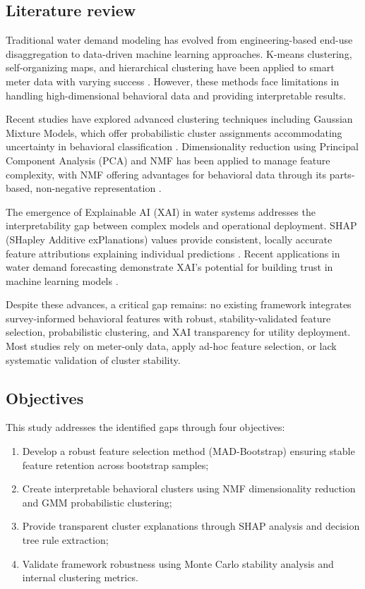 \documentclass[a4paper,12pt]{article}
\begin{document}
\subsection{Literature review}

Traditional water demand modeling has evolved from engineering-based end-use disaggregation \citep{Stewart2010} to data-driven machine learning approaches. K-means clustering, self-organizing maps, and hierarchical clustering have been applied to smart meter data with varying success \citep{CardellOliver2016}. However, these methods face limitations in handling high-dimensional behavioral data and providing interpretable results.

Recent studies have explored advanced clustering techniques including Gaussian Mixture Models, which offer probabilistic cluster assignments accommodating uncertainty in behavioral classification \citep{Cominola2019}. Dimensionality reduction using Principal Component Analysis (PCA) and NMF has been applied to manage feature complexity, with NMF offering advantages for behavioral data through its parts-based, non-negative representation \citep{Lee1999}.

The emergence of Explainable AI (XAI) in water systems addresses the interpretability gap between complex models and operational deployment. SHAP (SHapley Additive exPlanations) values provide consistent, locally accurate feature attributions explaining individual predictions \citep{Lundberg2017}. Recent applications in water demand forecasting demonstrate XAI's potential for building trust in machine learning models \citep{Xenochristou2020}.

Despite these advances, a critical gap remains: no existing framework integrates survey-informed behavioral features with robust, stability-validated feature selection, probabilistic clustering, and XAI transparency for utility deployment. Most studies rely on meter-only data, apply ad-hoc feature selection, or lack systematic validation of cluster stability.

\subsection{Objectives}

This study addresses the identified gaps through four objectives:

\begin{enumerate}
    \item Develop a robust feature selection method (MAD-Bootstrap) ensuring stable feature retention across bootstrap samples;
    \item Create interpretable behavioral clusters using NMF dimensionality reduction and GMM probabilistic clustering;
    \item Provide transparent cluster explanations through SHAP analysis and decision tree rule extraction;
    \item Validate framework robustness using Monte Carlo stability analysis and internal clustering metrics.
\end{enumerate}
\end{document}
